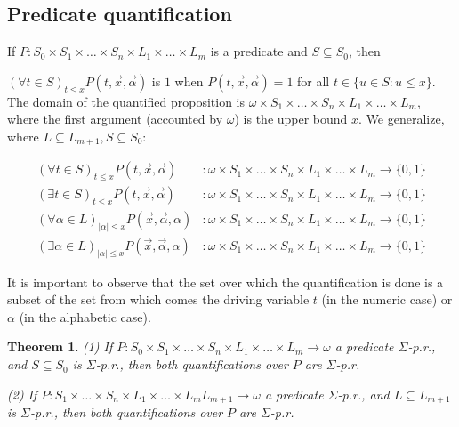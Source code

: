 \documentclass[a4paper, 12pt]{article}
\newtheorem{theorem}{Theorem}
\newtheorem{theorem}{Theorem}
\begin{document}
\subsection{Predicate quantification}

If $P : S_0 \times S_1 \times \ldots \times S_n \times L_1 \times \ldots \times
L_m $ is a predicate and $S \subseteq S_0$, then 

$(\forall t \in S)_{t \leq x}P(t, \overrightarrow{x}, \overrightarrow{\alpha})$ is $1$ when $P(t,
\overrightarrow{x}, \overrightarrow{\alpha}) = 1$ for all $t \in \{u \in S: u
\leq x\}$. The domain of the quantified proposition is $\omega \times S_1 \times
\ldots \times S_n \times L_1 \times \ldots \times L_m $, where the first
argument (accounted by $\omega$) is the upper bound $x$. We generalize, where $L
\subseteq L_{m+1}, S \subseteq S_0$:


\begin{align*}
    (\forall t \in S)_{t \leq x}P(t, \overrightarrow{x},
    \overrightarrow{\alpha})  
    &: \omega \times S_1 \times \ldots \times S_n \times L_1 \times \ldots \times L_m \to \{0, 1\}\\ 
    (\exists t \in S)_{t \leq x}P(t, \overrightarrow{x},
    \overrightarrow{\alpha}) 
    &: \omega \times S_1 \times \ldots \times S_n \times L_1 \times \ldots \times L_m \to \{0, 1\}\\ 
    (\forall \alpha \in L)_{|\alpha| \leq x}P(\overrightarrow{x},
    \overrightarrow{\alpha}, \alpha) 
    &: \omega \times S_1 \times \ldots \times S_n \times L_1 \times \ldots \times L_m \to \{0, 1\}\\ 
    (\exists \alpha \in L)_{|\alpha| \leq x}P(\overrightarrow{x},
    \overrightarrow{\alpha}, \alpha) 
    &: \omega \times S_1 \times \ldots \times S_n \times L_1 \times \ldots \times L_m \to \{0, 1\}
\end{align*}

It is important to observe that the set over which the quantification is done is
a subset of the set from which comes the driving variable $t$ (in the numeric
case) or $\alpha$ (in the alphabetic case).

\begin{theorem}
    \textit{(1)} If $P: S_0 \times S_1 \times \ldots \times S_n \times L_1 \times
    \ldots \times L_m  \to \omega$ a predicate $\Sigma$-p.r., and $S \subseteq
    S_0$ is $\Sigma$-p.r., then both quantifications over $P$ are $\Sigma$-p.r.


    \textit{(2)} If $P: S_1 \times \ldots \times S_n \times L_1 \times
    \ldots \times L_m  L_{m+1} \to \omega$ a predicate $\Sigma$-p.r., and $L \subseteq
    L_{m+1}$ is $\Sigma$-p.r., then both quantifications over $P$ are $\Sigma$-p.r.
\end{theorem}
\end{document}
